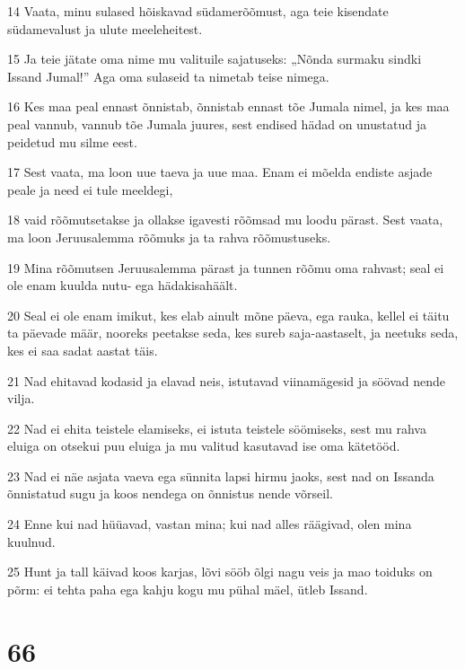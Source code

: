 \par 14 Vaata, minu sulased hõiskavad südamerõõmust, aga teie kisendate südamevalust ja ulute meeleheitest.
\par 15 Ja teie jätate oma nime mu valituile sajatuseks: „Nõnda surmaku sindki Issand Jumal!” Aga oma sulaseid ta nimetab teise nimega.
\par 16 Kes maa peal ennast õnnistab, õnnistab ennast tõe Jumala nimel, ja kes maa peal vannub, vannub tõe Jumala juures, sest endised hädad on unustatud ja peidetud mu silme eest.
\par 17 Sest vaata, ma loon uue taeva ja uue maa. Enam ei mõelda endiste asjade peale ja need ei tule meeldegi,
\par 18 vaid rõõmutsetakse ja ollakse igavesti rõõmsad mu loodu pärast. Sest vaata, ma loon Jeruusalemma rõõmuks ja ta rahva rõõmustuseks.
\par 19 Mina rõõmutsen Jeruusalemma pärast ja tunnen rõõmu oma rahvast; seal ei ole enam kuulda nutu- ega hädakisahäält.
\par 20 Seal ei ole enam imikut, kes elab ainult mõne päeva, ega rauka, kellel ei täitu ta päevade määr, nooreks peetakse seda, kes sureb saja-aastaselt, ja neetuks seda, kes ei saa sadat aastat täis.
\par 21 Nad ehitavad kodasid ja elavad neis, istutavad viinamägesid ja söövad nende vilja.
\par 22 Nad ei ehita teistele elamiseks, ei istuta teistele söömiseks, sest mu rahva eluiga on otsekui puu eluiga ja mu valitud kasutavad ise oma kätetööd.
\par 23 Nad ei näe asjata vaeva ega sünnita lapsi hirmu jaoks, sest nad on Issanda õnnistatud sugu ja koos nendega on õnnistus nende võrseil.
\par 24 Enne kui nad hüüavad, vastan mina; kui nad alles räägivad, olen mina kuulnud.
\par 25 Hunt ja tall käivad koos karjas, lõvi sööb õlgi nagu veis ja mao toiduks on põrm: ei tehta paha ega kahju kogu mu pühal mäel, ütleb Issand.

\chapter{66}

